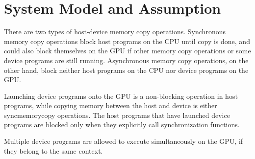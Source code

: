 \section{System Model and Assumption}
\label{sec:model}

There are two types of host-device memory copy operations.
Synchronous memory copy operations block host programs on the CPU until
copy is done, and could also block themselves on the GPU if other memory
copy operations or some device programs are still running.
Asynchronous memory copy operations, on the other hand, block neither
host programs on the CPU nor device programs on the GPU.

Launching device programs onto the GPU is a non-blocking operation in
host programs, while copying memory between the host and device is
either syncmemorycopy operations.
The host programs that have launched device programs are blocked only
when they explicitly call synchronization functions.

Multiple device programs are allowed to execute simultaneously on the
GPU, if they belong to the same context.


